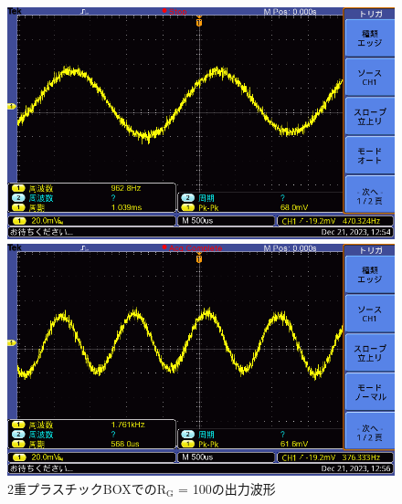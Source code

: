 \documentclass{ltjsarticle}
\begin{document}
\begin{figure}[H]
\begin{minipage}{0.4\columnwidth}
			\end{minipage}
			\hspace{0.04\columnwidth}
			\begin{minipage}{0.4\columnwidth}
			\centering
			\includegraphics[width = \columnwidth]{figs/F0024TEK.PNG}
			\end{minipage}
			\hspace{0.04\columnwidth}
			\begin{minipage}{0.4\columnwidth}
			\centering
			\includegraphics[width = \columnwidth]{figs/F0025TEK.PNG}
			\end{minipage}
			\caption{2重プラスチックBOXでの$\mathrm{R_G}$ = 100\Omega の出力波形}
			\label{fig:week5-2}
			\end{figure}
\end{document}
